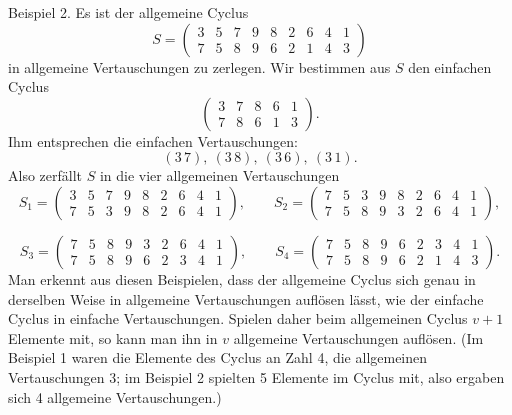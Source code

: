 \documentclass[11pt]{article}
\providecommand{\weberpage}[1]{}
\begin{document}
Beispiel 2. Es ist der allgemeine Cyclus
\[
S = \begin{pmatrix} 3 & 5 & 7 & 9 & 8 & 2 & 6 & 4 & 1 \\ 7 & 5 & 8 & 9 & 6 & 2 & 1 & 4 & 3 \end{pmatrix}
\]
in allgemeine Vertauschungen zu zerlegen. Wir bestimmen aus $S$ den einfachen Cyclus
\[
\begin{pmatrix} 3 & 7 & 8 & 6 & 1 \\ 7 & 8 & 6 & 1 & 3 \end{pmatrix}.
\]
Ihm entsprechen die einfachen Vertauschungen:
\[
(3\,7),\ (3\,8),\ (3\,6),\ (3\,1).
\]
Also zerfällt $S$ in die vier allgemeinen Vertauschungen
\[
S_1 = \begin{pmatrix} 3 & 5 & 7 & 9 & 8 & 2 & 6 & 4 & 1 \\ 7 & 5 & 3 & 9 & 8 & 2 & 6 & 4 & 1 \end{pmatrix}, \qquad
S_2 = \begin{pmatrix} 7 & 5 & 3 & 9 & 8 & 2 & 6 & 4 & 1 \\ 7 & 5 & 8 & 9 & 3 & 2 & 6 & 4 & 1 \end{pmatrix},
\]


\weberpage{10}
\[
S_3 = \begin{pmatrix} 7 & 5 & 8 & 9 & 3 & 2 & 6 & 4 & 1 \\ 7 & 5 & 8 & 9 & 6 & 2 & 3 & 4 & 1 \end{pmatrix}, \qquad
S_4 = \begin{pmatrix} 7 & 5 & 8 & 9 & 6 & 2 & 3 & 4 & 1 \\ 7 & 5 & 8 & 9 & 6 & 2 & 1 & 4 & 3 \end{pmatrix}.
\]
Man erkennt aus diesen Beispielen, dass der allgemeine Cyclus sich genau in derselben Weise in allgemeine Vertauschungen auflösen lässt, wie der einfache Cyclus in einfache Vertauschungen. Spielen daher beim allgemeinen Cyclus $v+1$ Elemente mit, so kann man ihn in $v$ allgemeine Vertauschungen auflösen. (Im Beispiel 1 waren die Elemente des Cyclus an Zahl 4, die allgemeinen Vertauschungen 3; im Beispiel 2 spielten 5 Elemente im Cyclus mit, also ergaben sich 4 allgemeine Vertauschungen.)
\end{document}

